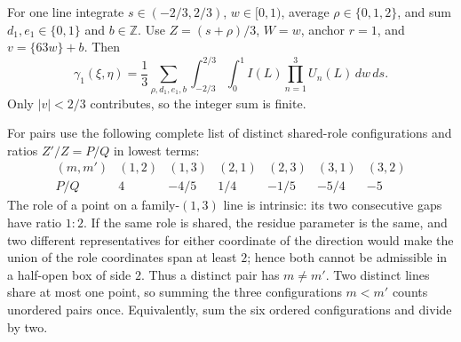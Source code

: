 For one line integrate $s\in(-2/3,2/3)$, $w\in[0,1)$, average $\rho\in\{0,1,2\}$, and sum $d_1,e_1\in\{0,1\}$ and $b\in\mathbb Z$.
Use $Z=(s+\rho)/3$, $W=w$, anchor $r=1$, and $v=\{63w\}+b$.  Then
\begin{equation}\label{eq:gamma1}
 \gamma_1(\xi,\eta)=\frac13\sum_{\rho,d_1,e_1,b}\int_{-2/3}^{2/3}\!\int_0^1
 I(L)\prod_{n=1}^3U_n(L)\,dw\,ds .
\end{equation}
Only $|v|<2/3$ contributes, so the integer sum is finite.

For pairs use the following complete list of distinct shared-role configurations and ratios $Z'/Z=P/Q$ in lowest terms:
\[
\begin{array}{c|rrrrrr}
(m,m')&(1,2)&(1,3)&(2,1)&(2,3)&(3,1)&(3,2)\\
P/Q&4&-4/5&1/4&-1/5&-5/4&-5
\end{array}
\]
The role of a point on a family-$(1,3)$ line is intrinsic: its two consecutive gaps have ratio $1:2$.
If the same role is shared, the residue parameter is the same, and two different representatives for either coordinate of the direction
would make the union of the role coordinates span at least $2$; hence both cannot be admissible in a half-open box of side $2$.
Thus a distinct pair has $m\ne m'$.  Two distinct lines share at most one point, so summing the three configurations $m<m'$ counts unordered pairs once.
Equivalently, sum the six ordered configurations and divide by two.

